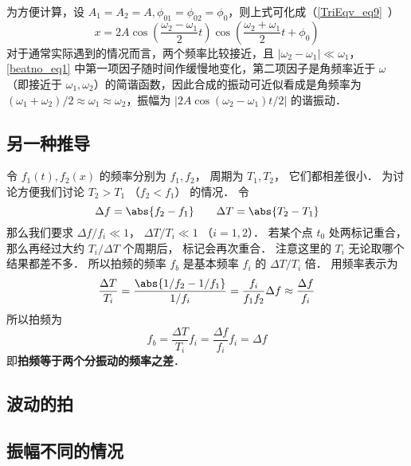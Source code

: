 为方便计算，设 $A_1=A_2=A,\phi_{01}=\phi_{02}=\phi_{0}$，则上式可化成（\autoref{TriEqv_eq9}~）
\begin{equation} \label{beatno_eq1}
x=2 A \cos \left(\frac{\omega_{2}-\omega_{1}}{2} t\right) \cos \left(\frac{\omega_{2}+\omega_{1}}{2} t+\phi_{0}\right)
\end{equation}
对于通常实际遇到的情况而言，两个频率比较接近，且 $\left|\omega_{2}-\omega_{1}\right|\ll \omega_1$，\autoref{beatno_eq1} 中第一项因子随时间作缓慢地变化，第二项因子是角频率近于 $\omega$（即接近于 $\omega_1,\omega_2$）的简谐函数，因此合成的振动可近似看成是角频率为 $(\omega_{1}+\omega_{2})/2 \approx \omega_{1} \approx \omega_{2}$，振幅为 $\left | 2 A \cos (\omega_{2}-\omega_{1})t/{2} \right |$ 的谐振动．

\subsection{另一种推导}

令 $f_1(t), f_2(x)$ 的频率分别为 $f_1, f_2$， 周期为 $T_1, T_2$， 它们都相差很小． 为讨论方便我们讨论 $T_2 > T_1$ （$f_2 < f_1$） 的情况． 令
\begin{equation}
\Delta f = \abs{f_2 - f_1}
\qquad
\Delta T = \abs{T_2 - T_1}
\end{equation}
那么我们要求 $\Delta f/f_i \ll 1$， $\Delta T/T_i \ll 1$ （$i = 1,2$）． 若某个点 $t_0$ 处两标记重合， 那么再经过大约 $T_i/\Delta T$ 个周期后， 标记会再次重合． 注意这里的 $T_i$ 无论取哪个结果都差不多． 所以拍频的频率 $f_b$ 是基本频率 $f_i$ 的 $\Delta T/T_i$ 倍． 用频率表示为
\begin{equation}
\frac{\Delta T}{T_i} = \frac{\abs{1/f_2 - 1/f_1}}{1/f_i} = \frac{f_i}{f_1 f_2} \Delta f \approx \frac{\Delta f}{f_i}
\end{equation}
所以拍频为
\begin{equation}
f_b = \frac{\Delta T}{T_i}f_i = \frac{\Delta f}{f_i} f_i = \Delta f
\end{equation}
即\textbf{拍频等于两个分振动的频率之差}．

\subsection{波动的拍}

\subsection{振幅不同的情况}
